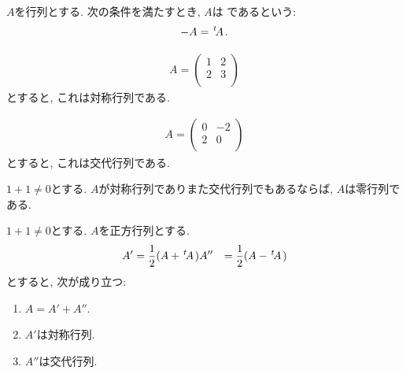 \begin{definition}
  \label{def:altmat}
  $A$を行列とする.
  次の条件を満たすとき,
  $A$は
  であるという:
  \begin{align*}
    -A={\left.^{t}\!A\right.}.
  \end{align*}
\end{definition}

\begin{example}
  \begin{align*}
    A=
    \begin{pmatrix}
      1&2\\
      2&3\\
    \end{pmatrix}
  \end{align*}
  とすると, これは対称行列である.
\end{example}

\begin{example}
  \begin{align*}
    A=
    \begin{pmatrix}
      0&-2\\
      2&0\\
    \end{pmatrix}
  \end{align*}
  とすると, これは交代行列である.
\end{example}

\begin{prop}
  $1+1\neq 0$とする.
  $A$が対称行列でありまた交代行列でもあるならば,
  $A$は零行列である.
\end{prop}
\begin{prop}
  $1+1\neq 0$とする.
  $A$を正方行列とする.
  \begin{align*}
    A'&=\frac{1}{2}(A+{\left.^{t}\!A\right.})
    A''&=\frac{1}{2}(A-{\left.^{t}\!A\right.})
  \end{align*}
  とすると, 次が成り立つ:
  \begin{enumerate}
  \item $A=A'+A''$.
  \item $A'$は対称行列.
  \item $A''$は交代行列.
  \end{enumerate}
\end{prop}

